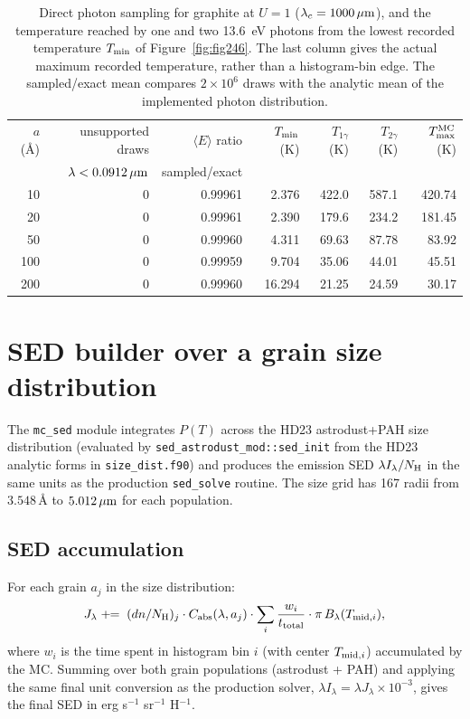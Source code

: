 \documentclass{my_memo}
\newcommand{\Cabs}{C_{\rm abs}}
\newcommand{\umc}{\,\mu{\rm m}}
\newcommand{\Blam}{B_\lambda}
\begin{document}
\begin{table}[ht]
\centering
\caption{Direct photon sampling for graphite at $U=1$
  ($\lambda_c=1000\umc$), and the temperature reached by one and two
  13.6~eV photons from the lowest recorded temperature $T_{\rm min}$
  of Figure~\ref{fig:fig246}. The last column gives the actual
  maximum recorded temperature, rather than a histogram-bin edge.
  The sampled/exact mean compares $2\times10^6$ draws with the
  analytic mean of the implemented photon distribution.}
\label{tab:sampler}
\begin{tabular}{rrrrrrr}
\toprule
$a$ (\AA) & unsupported draws & $\langle E\rangle$ ratio & $T_{\rm min}$ (K)
  & $T_{1\gamma}$ (K) & $T_{2\gamma}$ (K) & $T_{\rm max}^{\rm MC}$ (K) \\
 & $\lambda<0.0912\umc$ & sampled/exact & & & & \\
\midrule
10  & 0 & 0.99961 & 2.376 & 422.0 & 587.1 & 420.74 \\
20  & 0 & 0.99961 & 2.390 & 179.6 & 234.2 & 181.45 \\
50  & 0 & 0.99960 & 4.311 & 69.63 & 87.78 & 83.92 \\
100 & 0 & 0.99959 & 9.704 & 35.06 & 44.01 & 45.51 \\
200 & 0 & 0.99960 & 16.294 & 21.25 & 24.59 & 30.17 \\
\bottomrule
\end{tabular}
\end{table}

\section{SED builder over a grain size distribution}\label{sec:sed}

The \verb|mc_sed| module integrates $P(T)$ across the HD23 astrodust+PAH
size distribution (evaluated by \verb|sed_astrodust_mod::sed_init| from
the HD23 analytic forms in \verb|size_dist.f90|) and produces the emission
SED $\lambda I_\lambda / N_{\rm H}$ in the same units as the production
\verb|sed_solve| routine. The size grid has 167 radii from
$3.548\,\textrm{\AA}$ to $5.012\umc$ for each population.

\subsection{SED accumulation}

For each grain $a_j$ in the size distribution:
\begin{equation}\label{eq:sed_sum}
J_\lambda \;+\!\!= \; (dn/N_{\rm H})_j \cdot \Cabs(\lambda, a_j) \cdot
   \sum_{i} \frac{w_i}{t_{\rm total}} \cdot \pi\,\Blam(T_{{\rm mid},i}),
\end{equation}
where $w_i$ is the time spent in histogram bin $i$ (with center
$T_{{\rm mid},i}$) accumulated by the MC.  Summing over both grain
populations (astrodust + PAH) and applying the same final unit
conversion as the production solver,
$\lambda I_\lambda = \lambda J_\lambda \times 10^{-3}$, gives the
final SED in erg s$^{-1}$ sr$^{-1}$ H$^{-1}$.
\end{document}
